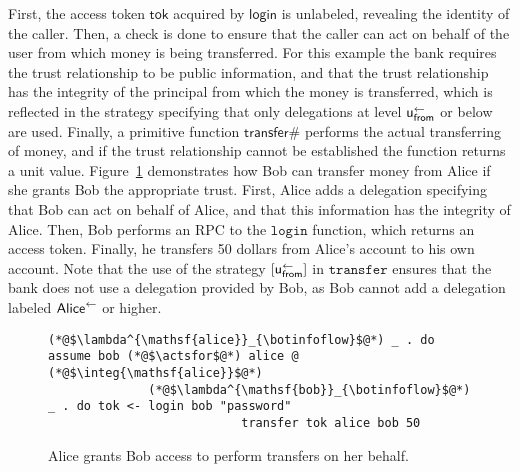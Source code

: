 First, the access token $\mathsf{tok}$ acquired by $\mathsf{login}$ is unlabeled, revealing the identity of the caller. Then, a check is done to ensure that the caller can act on behalf of the user from which money is being transferred. For this example the bank requires the trust relationship to be public information, and that the trust relationship has the integrity of the principal from which the money is transferred, which is reflected in the strategy specifying that only delegations at level $\mathsf{u}_{\mathsf{from}}^{\leftarrow}$ or below are used. Finally, a primitive function $\mathsf{transfer\#}$ performs the actual transferring of money, and if the trust relationship cannot be established the function returns a unit value. Figure~\ref{fig:bob-transfer-from-alice} demonstrates how Bob can transfer money from Alice if she grants Bob the appropriate trust. First, Alice adds a delegation specifying that Bob can act on behalf of Alice, and that this information has the integrity of Alice. Then, Bob performs an RPC to the $\mathtt{login}$ function, which returns an access token. Finally, he transfers 50 dollars from Alice's account to his own account. Note that the use of the strategy $[\mathsf{u}_{\mathsf{from}}^{\leftarrow}]$ in $\mathtt{transfer}$ ensures that the bank does not use a delegation provided by Bob, as Bob cannot add a delegation labeled $\mathsf{Alice}^{\leftarrow}$ or higher.

\begin{figure}
\centering
\begin{lstlisting}
(*@$\lambda^{\mathsf{alice}}_{\botinfoflow}$@*) _ . do assume bob (*@$\actsfor$@*) alice @ (*@$\integ{\mathsf{alice}}$@*)
              (*@$\lambda^{\mathsf{bob}}_{\botinfoflow}$@*) _ . do tok <- login bob "password"
                           transfer tok alice bob 50
\end{lstlisting}
\caption{Alice grants Bob access to perform transfers on her behalf.}
\label{fig:bob-transfer-from-alice}
\end{figure}